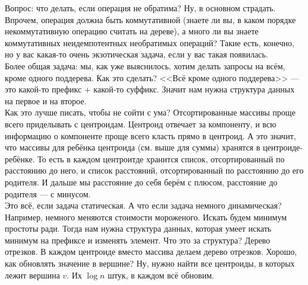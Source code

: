 \documentclass{article}
\begin{document}
    Вопрос: что делать, если операция не обратима? Ну, в основном страдать. Впрочем, операция должна быть коммутативной (знаете ли вы, в каком порядке некоммутативную операцию считать на дереве), а много ли вы знаете коммутативных неидемпотентных необратимых операций? Такие есть, конечно, но у вас какая-то очень экзотическая задача, если у вас такая появилась.\\
    Более общая задача: мы, как уже выяснилось, хотим делать запросы на всём, кроме одного поддерева. Как это сделать? <<Всё кроме одного поддерева>> --- это какой-то префикс + какой-то суффикс. Значит нам нужна структура данных на первое и на второе.\\
    Как это лучше писать, чтобы не сойти с ума? Отсортированные массивы проще всего приделывать с центроидам. Центроид отвечает за компоненту, и всю информацию о компоненте проще всего класть прямо в центроид. А это значит, что массивы для ребёнка центроида (см. выше для суммы) хранятся в центроиде-ребёнке. То есть в каждом центроитде хранится список, отсортированный по расстоянию до него, и список расстояний, отсортированный по расстоянию до его родителя. И дальше мы расстояние до себя берём с плюсом, расстояние до родителя --- с минусом.\\
    Это всё, если задача статическая. А что если задача немного динамическая? Например, немного меняются стоимости мороженого. Искать будем минимум простоты ради. Тогда нам нужна структура данных, которая умеет искать минимум на префиксе и изменять элемент. Что это за структура? Дерево отрезков. В каждом центроиде вместо массива делаем дерево отрезков. Хорошо, как обновлять значение в вершине? Ну, нужно найти все центроиды, в которых лежит вершина $v$. Их $\log n$ штук, в каждом всё обновим.
\end{document}
